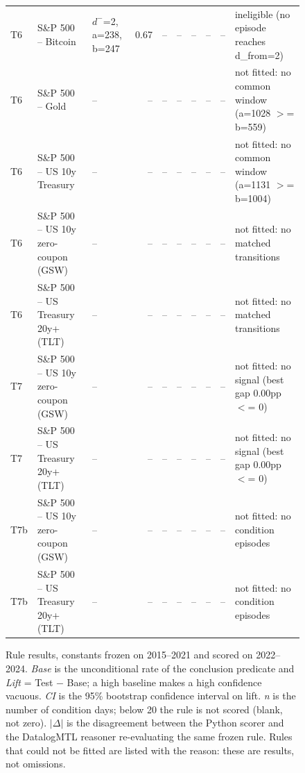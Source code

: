 \begin{figure}
\begin{tabular}{lllrrrrrrl}
T6 & S\&P 500 -- Bitcoin & $d^-$=2, a=238, b=247 & 0.67 & -- & -- & -- & -- & -- & ineligible (no episode reaches d\_from=2) \\
T6 & S\&P 500 -- Gold & -- & -- & -- & -- & -- & -- & -- & not fitted: no common window (a=1028 $>$= b=559) \\
T6 & S\&P 500 -- US 10y Treasury & -- & -- & -- & -- & -- & -- & -- & not fitted: no common window (a=1131 $>$= b=1004) \\
T6 & S\&P 500 -- US 10y zero-coupon (GSW) & -- & -- & -- & -- & -- & -- & -- & not fitted: no matched transitions \\
T6 & S\&P 500 -- US Treasury 20y+ (TLT) & -- & -- & -- & -- & -- & -- & -- & not fitted: no matched transitions \\
T7 & S\&P 500 -- US 10y zero-coupon (GSW) & -- & -- & -- & -- & -- & -- & -- & not fitted: no signal (best gap 0.00pp $<$= 0) \\
T7 & S\&P 500 -- US Treasury 20y+ (TLT) & -- & -- & -- & -- & -- & -- & -- & not fitted: no signal (best gap 0.00pp $<$= 0) \\
T7b & S\&P 500 -- US 10y zero-coupon (GSW) & -- & -- & -- & -- & -- & -- & -- & not fitted: no condition episodes \\
T7b & S\&P 500 -- US Treasury 20y+ (TLT) & -- & -- & -- & -- & -- & -- & -- & not fitted: no condition episodes \\
\bottomrule
\end{tabular}
\caption{Rule results, constants frozen on 2015--2021 and scored on 2022--2024. \emph{Base} is the unconditional rate of the conclusion predicate and \emph{Lift} = Test $-$ Base; a high baseline makes a high confidence vacuous. \emph{CI} is the 95\% bootstrap confidence interval on lift. \emph{n} is the number of condition days; below 20 the rule is not scored (blank, not zero). $|\Delta|$ is the disagreement between the Python scorer and the DatalogMTL reasoner re-evaluating the same frozen rule. Rules that could not be fitted are listed with the reason: these are results, not omissions.}
\label{fig:rule-results_classifier}
\end{figure}
